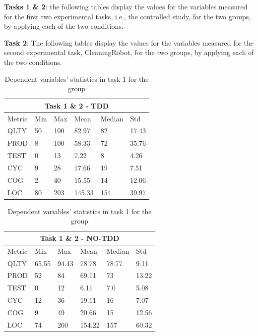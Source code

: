 \textbf{Tasks 1 \& 2}: the following tables display the values for the variables measured for the first two experimental tasks, i.e., the controlled study, for the two groups, by applying each of the two conditions.

\noindent \textbf{Task 2}: The following tables display the values for the variables measured for the second experimental task, CleaningRobot, for the two groups, by applying each of the two conditions.
\begin{table}[!h]
    \begin{center} 
        \begin{tabular}{ |p{2cm}||p{1.6cm}|p{1.6cm}|p{1.6cm}|p{1.6cm}|p{1.6cm}|}
            \hline
                \multicolumn{6}{|c|}{Task 1 \& 2 - TDD} \\
            \hline
                Metric & Min & Max & Mean & Median & Std\\
            \hline
                QLTY & 50 & 100 & 82.97 & 82 & 17.43 \\
                PROD & 8 & 100 & 58.33 & 72 & 35.76 \\
                TEST & 0 & 13 & 7.22 & 8 & 4.26 \\
                CYC & 9 & 28 & 17.66 & 19 & 7.51 \\
                COG & 2 & 40 & 15.55 & 14 & 12.06 \\
                LOC & 80 & 203 & 145.33 & 154 & 39.97 \\
            \hline
        \end{tabular}
        \caption{\label{tab_dv_t1_2_tdd}Dependent variables' statistics in task 1 for the \tdd group}
    \end{center}
\end{table}

\begin{table}[!h]
    \begin{center} 
        \begin{tabular}{ |p{2cm}||p{1.6cm}|p{1.6cm}|p{1.6cm}|p{1.6cm}|p{1.6cm}|}
            \hline
                \multicolumn{6}{|c|}{Task 1 \& 2 - NO-TDD} \\
            \hline
                Metric & Min & Max & Mean & Median & Std\\
            \hline
                QLTY & 65.55 & 94.43 & 78.78 & 78.77 & 9.11 \\
                PROD & 52 & 84 & 69.11 & 73 & 13.22 \\
                TEST & 0 & 12 & 6.11 & 7.0 & 5.08 \\
                CYC & 12 & 36 & 19.11 & 16 & 7.07 \\
                COG & 9 & 49 & 20.66 & 15 & 12.56 \\
                LOC & 74 & 260 & 154.22 & 157 & 60.32 \\
            \hline
        \end{tabular}
        \caption{\label{tab_dv_t1_2_notdd}Dependent variables' statistics in task 1 for the \notdd group}
    \end{center}
\end{table}


